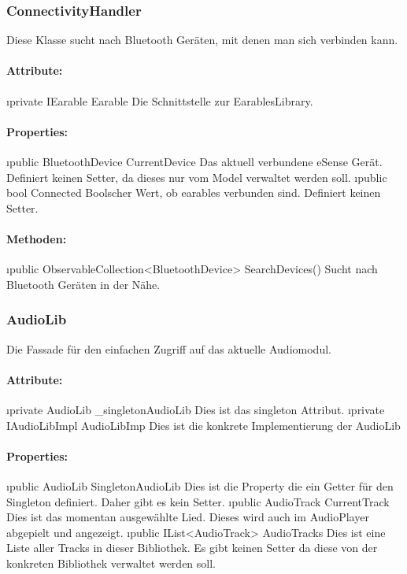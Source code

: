 \documentclass[../entwurf.tex]{subfiles}
\begin{document}
			\subsubsection{ConnectivityHandler}
				Diese Klasse sucht nach Bluetooth Geräten, mit denen man sich verbinden kann.
				\paragraph{Attribute:}
					\begin{itemize}
						\i{private IEarable Earable} Die Schnittstelle zur EarablesLibrary.
					\end{itemize}
				\paragraph{Properties:}
					\begin{itemize}
						\i{public BluetoothDevice CurrentDevice} Das aktuell verbundene eSense Gerät. Definiert keinen Setter, da dieses nur vom Model
						verwaltet werden soll.
						\i{public bool Connected} Boolscher Wert, ob earables verbunden sind. Definiert keinen Setter.
					\end{itemize}
				\paragraph{Methoden:}
					\begin{itemize}
						\i{public ObservableCollection<BluetoothDevice> SearchDevices()} Sucht nach Bluetooth Geräten in der Nähe.
					\end{itemize}
			\subsubsection{AudioLib}
				Die Fassade für den einfachen Zugriff auf das aktuelle Audiomodul.
				\paragraph{Attribute:}
					\begin{itemize}
						\i{private AudioLib \_singletonAudioLib} Dies ist das singleton Attribut.
						\i{private IAudioLibImpl AudioLibImp} Dies ist die konkrete Implementierung der
						AudioLib
					\end{itemize}
				\paragraph{Properties:}
					\begin{itemize}
						\i{public AudioLib SingletonAudioLib} Dies ist die Property die ein Getter für den
						Singleton definiert. Daher gibt es kein Setter.
						\i{public AudioTrack CurrentTrack} Dies ist das momentan ausgewählte Lied. Dieses
						wird auch im AudioPlayer abgepielt und angezeigt.
						\i{public IList<AudioTrack> AudioTracks} Dies ist eine Liste aller Tracks in dieser
						Bibliothek. Es gibt keinen Setter da diese von der konkreten Bibliothek verwaltet werden soll.
					\end{itemize}
\end{document}
